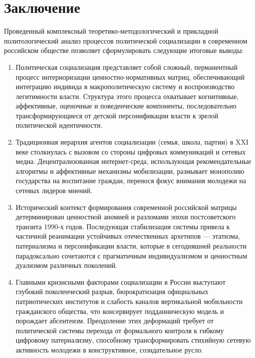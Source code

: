 \section*{Заключение}

Проведенный комплексный теоретико-методологический и прикладной политологический анализ процессов политической социализации в современном российском обществе позволяет сформулировать следующие итоговые выводы:

\begin{enumerate}
    \item Политическая социализация представляет собой сложный, перманентный процесс интериоризации ценностно-нормативных матриц, обеспечивающий интеграцию индивида в макрополитическую систему и воспроизводство легитимности власти. Структура этого процесса охватывает когнитивные, аффективные, оценочные и поведенческие компоненты, последовательно трансформирующиеся от детской персонификации власти к зрелой политической идентичности.
    \item Традиционная иерархия агентов социализации (семья, школа, партии) в XXI веке столкнулась с вызовом со стороны цифровых коммуникаций и сетевых медиа. Децентрализованная интернет-среда, использующая рекомендательные алгоритмы и аффективные механизмы мобилизации, размывает монополию государства на воспитание граждан, перенося фокус внимания молодежи на сетевых лидеров мнений.
    \item Исторический контекст формирования современной российской матрицы детерминирован ценностной аномией и разломами эпохи постсоветского транзита 1990-х годов. Последующая стабилизация системы привела к частичной реанимации устойчивых отечественных архетипов — этатизма, патернализма и персонификации власти, которые в сегодняшней реальности парадоксально сочетаются с прагматичным индивидуализмом и ценностным дуализмом различных поколений.
    \item Главными кризисными факторами социализации в России выступают глубокий поколенческий разрыв, бюрократизация официальных патриотических институтов и слабость каналов вертикальной мобильности гражданского общества, что консервирует подданническую модель и порождает абсентеизм. Преодоление этих деформаций требует от политической системы перехода от формального контроля к гибкому цифровому патернализму, способному трансформировать стихийную сетевую активность молодежи в конструктивное, созидательное русло.
\end{enumerate}